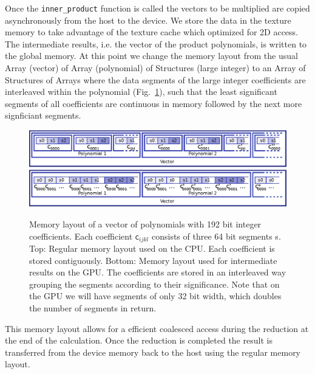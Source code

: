 \documentclass[oribibl,a4paper]{llncs2e/llncs}
\begin{document}
Once the \verb|inner_product| function is called the vectors to be multiplied are copied asynchronously from the host to the device.
We store the data in the texture memory to take advantage of the texture cache which optimized for 2D access.
The intermediate results, i.e. the vector of the product polynomials, is written to the global memory.
At this point we change the memory layout from the usual Array (vector) of Array (polynomial) of Structures (large integer) to an Array of Structures of Arrays where the data segments of the large integer coefficients are interleaved within the polynomial (Fig.\ \ref{fig:GPU_data_layout}), such that the least significant segments of all coefficients are continuous in memory followed by the next more signficiant segments.
\begin{figure}[t]
    \centering
\includegraphics[scale=0.9]{memory_layout.eps} \\
    \vspace{0.5cm}
\includegraphics[scale=0.9]{memory_layout_gpu.eps} 
    \caption{Memory layout of a vector of polynomials with 192 bit integer coefficients.
             Each coefficient $\textsf{c}_{ijkl}$ consists of three 64 bit segments \textsf{s}.
             Top: Regular memory layout used on the CPU. Each coefficient is stored contiguously.
             Bottom: Memory layout used for intermediate results on the GPU. The coefficients are stored in an interleaved way grouping the segments according to their significance.
             Note that on the GPU we will have segments of only 32 bit width, which doubles the number of segments in return.
    }
    \label{fig:GPU_data_layout}
\end{figure}
This memory layout allows for a efficient coalesced access during the reduction at the end of the calculation.
Once the reduction is completed the result is transferred from the device memory back to the host using the regular memory layout.
\end{document}
